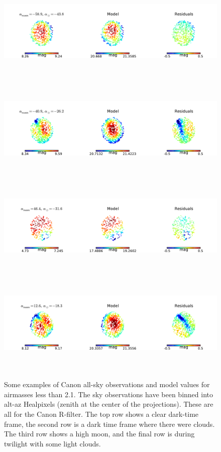 \documentclass[]{spie}
\begin{document}
\begin{figure}
  \includegraphics[height=5cm]{plots/exampleSkys_0.pdf}
  \includegraphics[height=5cm]{plots/exampleSkys_1.pdf}
  \includegraphics[height=5cm]{plots/exampleSkys_2.pdf}
  \includegraphics[height=5cm]{plots/exampleSkys_3.pdf}
  \caption{Some examples of Canon all-sky observations and model values for airmasses less than 2.1. The sky observations have been binned into alt-az Healpixels (zenith at the center of the projections). These are all for the Canon R-filter. The top row shows a clear dark-time frame, the second row is a dark time frame where there were clouds. The third row shows a high moon, and the final row is during twilight with some light clouds. \label{fig:skyExamples}}
\end{figure}
\end{document}
